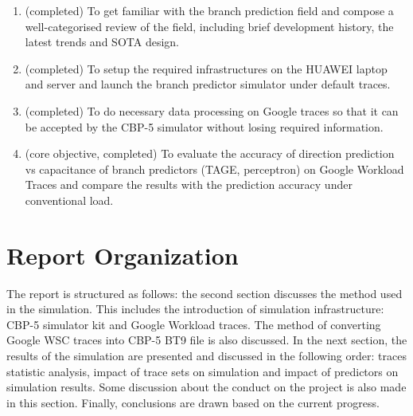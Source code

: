 \begin{enumerate}[itemsep= 0pt,topsep = 0pt, partopsep=4 pt, leftmargin= 32 pt]
\item (completed) To get familiar with the branch prediction field and compose a well-categorised review of the field, including brief development history, the latest trends and SOTA design.
\item (completed) To setup the required infrastructures on the HUAWEI laptop and server and launch the branch  predictor simulator under default traces. 
\item(completed) To do necessary data processing on Google traces so that it can be accepted by the CBP-5 simulator without losing required information. 
\item(core objective, completed) To evaluate the accuracy of direction prediction vs capacitance of branch predictors (TAGE, perceptron) on Google Workload Traces and compare the results with the prediction accuracy under conventional load.
\end{enumerate}

\section{Report Organization}  %
\label{section1.3}

The report is structured as follows: the second section discusses the method used in the 
simulation. This includes the introduction of simulation infrastructure: CBP-5 simulator kit and Google Workload traces. The method of converting Google WSC traces into CBP-5 BT9 file is also discussed. In the next section, the results of the simulation are presented and discussed in the following order: traces statistic analysis, impact of trace sets on simulation and impact of predictors on simulation results. Some discussion about the conduct on the project is also made in this section. Finally, conclusions are drawn based on the current progress.



